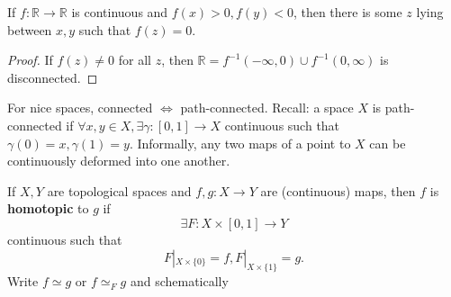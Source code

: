 \documentclass{article}
\begin{document}
\begin{cor}
  If $f: \mathbb{R} \to \mathbb{R}$ is continuous and $f(x)>0, f(y) < 0$, then there is some $z$ lying between $x,y$ such that $f(z) = 0$.
\end{cor}
\begin{proof}
  If $f(z) \neq 0$ for all $z$, then $\mathbb{R} = f^{-1}(-\infty,0) \cup f^{-1}(0, \infty)$ is disconnected.
\end{proof}
For nice spaces, connected $\iff$ path-connected.
Recall: a space $X$ is path-connected if $\forall x,y \in X, \exists \gamma:[0,1] \to X$ continuous such that $\gamma(0) = x, \gamma(1) = y$.
Informally, any two maps of a point to $X$ can be continuously deformed into one another.
\begin{center}
\end{center}
\begin{defi}[Homotopy]
  If $X,Y$ are topological spaces and $f,g : X \to Y$ are (continuous) maps, then $f$ is \textbf{homotopic} to $g$ if
  \begin{equation*}
    \exists F: X \times [0,1] \to Y
  \end{equation*}
  continuous such that
  \begin{equation*}
    F|_{X \times \{0\}} = f,
    F|_{X \times \{1\}} = g.
  \end{equation*}
  Write $f \simeq g$ or $f \simeq_F g$ and schematically
  \begin{center}
  \end{center}
\end{defi}
\end{document}

